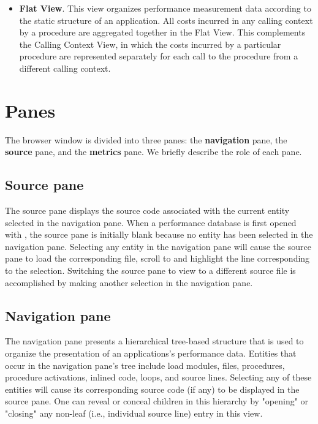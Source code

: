 \begin{itemize}
\item \textbf{Flat View}. This view organizes performance measurement data according to the static structure of an application. All costs incurred in any calling context by a procedure are aggregated together in the Flat View. This complements the Calling Context View, in which the costs incurred by a particular procedure are represented separately for each call to the procedure from a different calling context.

\end{itemize}



\section{Panes}

The browser window is divided into three panes: the \textbf{navigation} pane, the \textbf{source} pane, and the \textbf{metrics} pane. We briefly describe the role of each pane.


\subsection{Source pane} The source pane displays the source code associated with the current entity selected in the navigation pane. When a performance database is first opened with \hpcviewer{}, the source pane is initially blank because no entity has been selected in the navigation pane. Selecting any entity in the navigation pane will cause the source pane to load the corresponding file, scroll to and highlight the line corresponding to the selection. Switching the source pane to view to a different source file is accomplished by making another selection in the navigation pane.


\subsection{Navigation pane} The navigation pane presents a hierarchical tree-based structure that is used to organize the presentation of an applications's performance data. Entities that occur in the navigation pane's tree include load modules, files, procedures, procedure activations, inlined code, loops, and source lines. Selecting any of these entities will cause its corresponding source code (if any) to be displayed in the source pane. One can reveal or conceal children in this hierarchy by "opening" or "closing" any non-leaf (i.e., individual source line) entry in this view.

